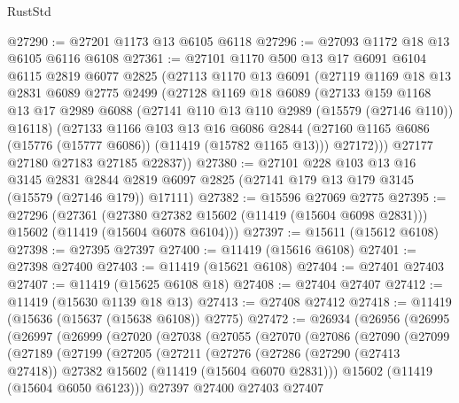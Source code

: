 \begin{lexlean}{RustStd}
\begin{coremodule}
@27290 := @27201 @1173 @13 @6105 @6118
@27296 := @27093 @1172 @18 @13 @6105 @6116 @6108
@27361 := @27101
    @1170
    @500
    @13
    @17
    @6091
    @6104
    @6115
    @2819
    @6077
    @2825
    (@27113
      @1170
      @13
      @6091
      (@27119
        @1169
        @18
        @13
        @2831
        @6089
        @2775
        @2499
        (@27128
          @1169
          @18
          @6089
          (@27133
            @159
            @1168
            @13
            @17
            @2989
            @6088
            (@27141 @110 @13 @110 @2989 (@15579 (@27146 @110)) @16118)
            (@27133
              @1166
              @103
              @13
              @16
              @6086
              @2844
              (@27160 @1165 @6086 (@15776 (@15777 @6086)) (@11419 (@15782 @1165 @13)))
              @27172)))
        @27177
        @27180
        @27183
        @27185
        @22837))
@27380 := @27101
    @228
    @103
    @13
    @16
    @3145
    @2831
    @2844
    @2819
    @6097
    @2825
    (@27141 @179 @13 @179 @3145 (@15579 (@27146 @179)) @17111)
@27382 := @15596 @27069 @2775
@27395 := @27296
    (@27361
      (@27380 @27382 @15602 (@11419 (@15604 @6098 @2831)))
      @15602
      (@11419 (@15604 @6078 @6104)))
@27397 := @15611 (@15612 @6108)
@27398 := @27395 @27397
@27400 := @11419 (@15616 @6108)
@27401 := @27398 @27400
@27403 := @11419 (@15621 @6108)
@27404 := @27401 @27403
@27407 := @11419 (@15625 @6108 @18)
@27408 := @27404 @27407
@27412 := @11419 (@15630 @1139 @18 @13)
@27413 := @27408 @27412
@27418 := @11419 (@15636 (@15637 (@15638 @6108)) @2775)
@27472 := @26934
    (@26956
      (@26995
        (@26997
          (@26999
            (@27020
              (@27038
                (@27055
                  (@27070
                    (@27086
                      (@27090
                        (@27099
                          (@27189
                            (@27199
                              (@27205
                                (@27211
                                  (@27276
                                    (@27286
                                      (@27290 (@27413 @27418))
                                      @27382
                                      @15602
                                      (@11419 (@15604 @6070 @2831)))
                                    @15602
                                    (@11419 (@15604 @6050 @6123)))
                                  @27397
                                  @27400
                                  @27403
                                  @27407

\end{coremodule}
\end{lexlean}
